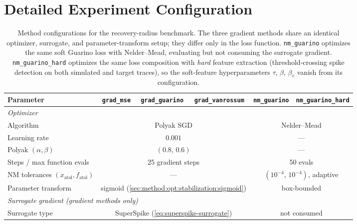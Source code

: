 \documentclass[final, english, biblatex]{kththesis}
\begin{document}
\section{Detailed Experiment Configuration}
\begin{landscape}
\begin{table}[t]
\centering
\caption{Method configurations for the recovery-radius benchmark. The three gradient methods share an identical optimizer, surrogate, and parameter-transform setup; they differ only in the loss function. \texttt{nm\_guarino} optimizes the same soft Guarino loss with Nelder--Mead, evaluating but not consuming the surrogate gradient. \texttt{nm\_guarino\_hard} optimizes the same loss composition with \emph{hard} feature extraction (threshold-crossing spike detection on both simulated and target traces), so the soft-feature hyperparameters $\tau$, $\beta$, $\beta_v$ vanish from its configuration.}
\label{tab:training-params}
\small
\setlength{\tabcolsep}{4pt}
\begin{tabular}{lccccc}
\toprule
\textbf{Parameter} & \texttt{grad\_mse} & \texttt{grad\_guarino} & \texttt{grad\_vanrossum} & \texttt{nm\_guarino} & \texttt{nm\_guarino\_hard} \\
\midrule
\multicolumn{6}{l}{\textit{Optimizer}} \\
Algorithm                 & \multicolumn{3}{c}{Polyak SGD}                                & \multicolumn{2}{c}{Nelder--Mead} \\
Learning rate             & \multicolumn{3}{c}{$0.001$}                                   & \multicolumn{2}{c}{---} \\
Polyak $(\alpha,\beta)$   & \multicolumn{3}{c}{$(0.8,\,0.6)$}                             & \multicolumn{2}{c}{---} \\
Steps / max function evals & \multicolumn{3}{c}{25 gradient steps}                         & \multicolumn{2}{c}{50 evals} \\
NM tolerances $(x_{\text{atol}}, f_{\text{atol}})$ & \multicolumn{3}{c}{---}                & \multicolumn{2}{c}{$(10^{-4},\,10^{-4})$, adaptive} \\
Parameter transform       & \multicolumn{3}{c}{sigmoid (\cref{sec:method:opt:stabilization:sigmoid})} & \multicolumn{2}{c}{box-bounded} \\
\midrule
\multicolumn{6}{l}{\textit{Surrogate gradient (gradient methods only)}} \\
Surrogate type            & \multicolumn{3}{c}{SuperSpike (\cref{eq:superspike-surrogate})} & \multicolumn{2}{c}{not consumed} \\

\end{tabular}
\end{table}
\end{landscape}
\end{document}

